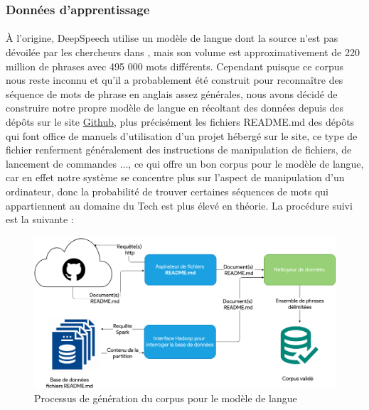 		\subsubsection*{Données d'apprentissage}
		\paragraph{}
		À l'origine, DeepSpeech utilise un modèle de langue dont la source n'est pas dévoilée par les chercheurs dans \cite{deepspeech_paper}, mais son volume est approximativement de 220 million de phrases avec 495 000 mots différents. Cependant puisque ce corpus nous reste inconnu et qu'il a probablement été construit pour reconnaître des séquence de mots de phrase en anglais assez générales, nous avons décidé de construire notre propre modèle de langue en récoltant des données depuis des dépôts sur le site \href{https://github.com/}{Github}, plus précisément les fichiers README.md des dépôts qui font office de manuels d'utilisation d'un projet hébergé sur le site, ce type de fichier renferment généralement des instructions de manipulation de fichiers, de lancement de commandes ..., ce qui offre un bon corpus pour le modèle de langue, car en effet notre système se concentre plus sur l'aspect de manipulation d'un ordinateur, donc la probabilité de trouver certaines séquences de mots qui appartiennent au domaine du Tech est plus élevé en théorie. La procédure suivi est la suivante : 
		\begin{figure}[H] 
			\label{lm_gathering}
			\centering
			\includegraphics[width=0.88\linewidth]{images/Conception/ASR/lm_gathering.png}
			\caption{Processus de génération du corpus pour le modèle de langue}
		\end{figure}
		\newpage
